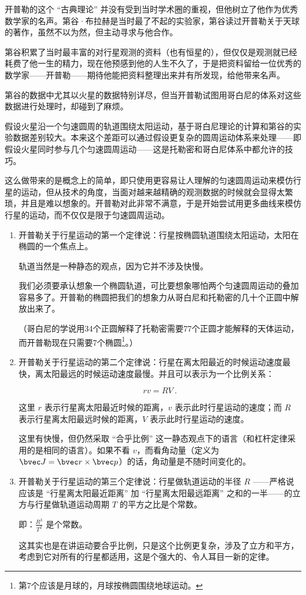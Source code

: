 开普勒的这个 “古典理论” 并没有受到当时学术圈的重视，但他树立了他作为优秀数学家的名声。第谷·布拉赫是当时最了不起的实验家，第谷读过开普勒关于天球的著作，虽然不以为然，但主动寻求与他合作。

第谷积累了当时最丰富的对行星观测的资料（也有恒星的），但仅仅是观测就已经耗费了他一生的精力，现在他预感到他的人生不久了，于是把资料留给一位优秀的数学家——开普勒——期待他能把资料整理出来并有所发现，给他带来名声。

第谷的数据中尤其以火星的数据特别详尽，但当开普勒试图用哥白尼的体系对这些数据进行处理时，却碰到了麻烦。

假设火星沿一个匀速圆周的轨道围绕太阳运动，基于哥白尼理论的计算和第谷的实验数据差别较大。本来这个差距可以通过假设更复杂的圆周运动体系来处理——即假设火星同时参与几个匀速圆周运动——这是托勒密和哥白尼体系中都允许的技巧。

这么做带来的是概念上的简单，即只使用更容易让人理解的匀速圆周运动来模仿行星的运动，但从技术的角度，当面对越来越精确的观测数据的时候就会显得太繁琐，并且是难以想象的。开普勒对此非常不满意，于是开始尝试用更多曲线来模仿行星的运动，而不仅仅是限于匀速圆周运动。

\begin{enumerate}
\item 

开普勒关于行星运动的第一个定律说：行星按椭圆轨道围绕太阳运动，太阳在椭圆的一个焦点上。

轨道当然是一种静态的观点，因为它并不涉及快慢。

我们必须要承认想象一个椭圆轨道，可比要想象哪怕两个匀速圆周运动的叠加容易多了。开普勒的椭圆把我们的想象力从哥白尼和托勒密的几十个正圆中解放出来了。

（哥白尼的学说用34个正圆解释了托勒密需要77个正圆才能解释的天体运动，而开普勒现在只需要7个椭圆\footnote{第7个应该是月球的，月球按椭圆围绕地球运动。}。）

\item

开普勒关于行星运动的第二个定律说：行星在离太阳最近的时候运动速度最快，离太阳最远的时候运动速度最慢。并且可以表示为一个比例关系：

\begin{equation}
r v = R V~.
\end{equation}

这里 $r$ 表示行星离太阳最近时候的距离，$v$ 表示此时行星运动的速度；而 $R$ 表示行星离太阳最远时候的距离，$V$ 表示此时行星运动的速度。

这里有快慢，但仍然采取 “合乎比例” 这一静态观点下的语言（和杠杆定律采用的是相同的语言）。如果不看 $v$，而看角动量（定义为 $\bvec J = \bvec r \times \bvec p$）的话，角动量是不随时间变化的。

\item

开普勒关于行星运动的第三个定律说：行星做轨道运动的半径 $R$ ——严格说应该是 “行星离太阳最近距离” 加 “行星离太阳最远距离” 之和的一半——的立方与行星做轨道运动周期 $T$ 的平方之比是个常数。

即：$\frac{R^3}{T^2} $ 是个常数。

这其实也是在讲运动要合乎比例，只是这个比例更复杂，涉及了立方和平方，考虑到它对所有的行星都适用，这是个强大的、令人耳目一新的定律。

\end{enumerate}


